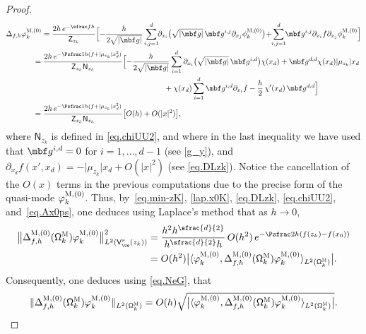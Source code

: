 \begin{proof}
\begin{align*}
\Delta_{f,h} \varphi^{\textsc{M},(0)}_k&=\frac{2h\, e^{-\sfrac f h}}{\mathsf Z_{z_k} }\Bigl[ -\frac{h}{2\sqrt{\vert \mbf g\vert}}\sum_{i,j=1}^d\hspace*{-1mm} \partial_{x_i}\bigl(\sqrt{\vert \mbf g\vert} \, \mbf g^{i,j} \partial_{x_j}\phi^{\textsc{M},(0)}_k \bigr) \!+ \hspace*{-1mm}\sum_{i,j=1}^d \hspace*{-1mm}\mbf g^{i,j} \partial_{x_i}f\partial_{x_j}\phi^{\textsc{M},(0)}_k\Bigr]\\
&\hspace*{-4mm}= \frac{2h \, e^{-\Psfrac 1h(f + \vert \mu_{z_k}\vert x_d^2)}}{\mathsf Z_{z_k}\mathsf N_{z_k}}
\Bigl[ -\frac{h}{2\sqrt{\vert \mbf g\vert}}\sum_{i=1}^d \partial_{x_i}\bigl(\sqrt{\vert \mbf g\vert} \, \mbf g^{i,d} \bigr)\chi(x_d) + \mbf g^{d,d}\chi (x_d)\vert \mu_{z_k}\vert x_d
\\
&\hspace*{5.65cm} + \chi(x_d) \sum_{i=1}^d \mbf g^{i,d} \partial_{x_i}f - \frac h2\,\chi'(x_d) \, \mbf g^{d,d} \Bigr] \\
&\hspace*{-4mm}=\frac{2h\, e^{-\Psfrac 1h(f + \vert \mu_{z_k}\vert x_d^2)}}{\mathsf Z_{z_k}\mathsf N_{z_k}}
\big[ O(h) + O(\vert x\vert^2) \big],
\end{align*}
where $\mathsf N_{z_k}$ is defined in \eqref{eq.chiUU2}, and where in the last inequality we have used that $\mbf g^{i,d}=0$ for $i=1,\ldots,d-1$ (see \eqref{g_y}), and $\partial_{x_d}f(x',x_d)= -\vert \mu_{z_k}\vert x_d+O(\vert x\vert^2)$ (see \eqref{eq.DLzk}).
Notice the cancellation of the $O(x)$ terms in the previous computations due to the precise form of the quasi-mode $\varphi^{\textsc{M},(0)}_k$.
Thus, by~\eqref{eq.min-zK}, \eqref{lap.x0K}, \eqref{eq.DLzk}, \eqref{eq.chiUU2}, and~\eqref{eq.Ax0ps}, one deduces using Laplace's method that as $h\to 0$,
\begin{align*}
\bigl\Vert \Delta_{f,h}^{\textsc{M}, (0)}(\mathsf \Omega_k^{\textsc{M}})\varphi^{\textsc{M},(0)}_k\bigr\Vert_{L^2(\mathsf V_{\ve}^r(z_k))}^2&= \frac{ h^2 h^{\sfrac{d}{2} } }{ h^{\sfrac{d}{2} } h}\, O(h^2) \, e^{-\Psfrac 2h (f(z_k)-f(x_0))} \\
&=O(h^2) \bigl\vert \langle \varphi^{\textsc{M},(0)}_k,\Delta_{f,h}^{\textsc{M}, (0)}(\mathsf \Omega_k^{\textsc{M}}) \varphi^{\textsc{M},(0)}_k \rangle_{L^2(\mathsf \Omega_k^{\textsc{M}})}\bigr\vert.
\end{align*}
Consequently, one deduces using \eqref{eq.NeG}, that
\begin{equation}\label{eq.Ax0ps2}
\Vert \Delta_{f,h}^{\textsc{M}, (0)}(\mathsf \Omega_k^{\textsc{M}})\varphi^{\textsc{M},(0)}_k\Vert_{L^2(\mathsf \Omega_k^{\textsc{M}})}=O(h) \sqrt{\bigl\vert \langle \varphi^{\textsc{M},(0)}_k,\Delta_{f,h}^{\textsc{M}, (0)}(\mathsf \Omega_k^{\textsc{M}}) \varphi^{\textsc{M},(0)}_k \rangle_{L^2(\mathsf \Omega_k^{\textsc{M}})}\bigr\vert}.
\end{equation}


\end{proof}
